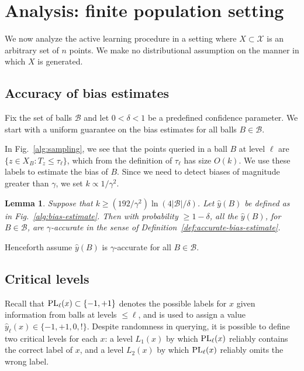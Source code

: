 \documentclass[twoside]{article}
\def\X{{\mathcal X}}
\def\B{{\mathcal B}}
\def\yh{{\widehat{y}}}
\def\PL{{\mbox{\rm PL}}}
\newtheorem{lemma}[thm]{Lemma}
\begin{document}
\section{Analysis: finite population setting}
\label{sec:discrete}

We now analyze the active learning procedure in a setting where $X \subset \X$ is an arbitrary set of $n$ points. We make no distributional assumption on the manner in which $X$ is generated.

\subsection{Accuracy of bias estimates}

Fix the set of balls $\B$ and let $0 < \delta < 1$ be a
predefined confidence parameter. We start with a uniform guarantee on the
bias estimates for all balls $B \in \B$.

In Fig.~\ref{alg:sampling}, we see that the points queried in a ball $B$ at level $\ell$ are $\{z \in X_B: T_z \leq \tau_\ell\}$, which from the definition of $\tau_\ell$ has size $O(k)$. We use these labels to estimate the bias of $B$. Since we need to detect biases of magnitude greater than $\gamma$, we set $k \propto 1/\gamma^2$. 
\begin{lemma}
Suppose that $k \geq (192/\gamma^2) \ln (4 |\B|/\delta)$. 
Let $\yh(B)$ be defined as in Fig.~\ref{alg:bias-estimate}. Then with probability $\geq 1-\delta$, all the $\yh(B)$, for $B \in \B$, are $\gamma$-accurate in the sense of Definition~\ref{def:accurate-bias-estimate}.
\label{lemma:accurate-bias-estimates}
\end{lemma}
Henceforth assume $\yh(B)$ is $\gamma$-accurate for all  $B \in \B$.


\subsection{Critical levels}

Recall that $\PL_\ell(x) \subset \{-1,+1\}$ denotes the possible labels for $x$ given information from balls at levels $\leq \ell$, and is used to assign a value $\yh_\ell(x) \in \{-1,+1,0,!\}$. Despite randomness in querying, it is possible to define two critical levels for each $x$: a level $L_1(x)$ by which $\PL_\ell(x)$ reliably contains the correct label of $x$, and a level $L_2(x)$ by which $\PL_\ell(x)$ reliably omits the wrong label.
\end{document}
